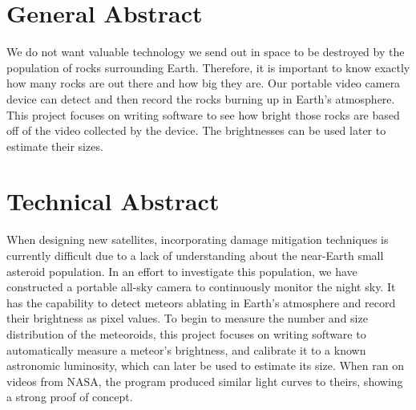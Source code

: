 \section*{General Abstract}
We do not want valuable technology we send out in space to be destroyed by the population of rocks surrounding Earth. Therefore, it is important to know exactly how many rocks are out there and how big they are. Our portable video camera device can detect and then record the rocks burning up in Earth's atmosphere. This project focuses on writing software to see how bright those rocks are based off of the video collected by the device. The brightnesses can be used later to estimate their sizes.

\section*{Technical Abstract}
When designing new satellites, incorporating damage mitigation techniques is currently difficult due to a lack of understanding about the near-Earth small asteroid population. In an effort to investigate this population, we have constructed a portable all-sky camera to continuously monitor the night sky. It has the capability to detect meteors ablating in Earth's atmosphere and record their brightness as pixel values. To begin to measure the number and size distribution of the meteoroids, this project focuses on writing software to automatically measure a meteor's brightness, and  calibrate it to a known astronomic luminosity, which can later be used to estimate its size. When ran on videos from NASA, the program produced similar light curves to theirs, showing a strong proof of concept.
